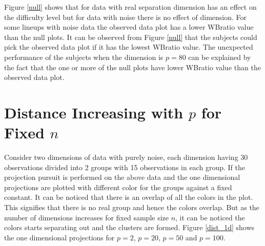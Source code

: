 \documentclass[12]{article}
\begin{document}
Figure \ref{null} shows that for data with real separation dimension has an effect on the difficulty level but for data with noise there is no effect of dimension. For some lineups with noise data the observed data plot has a lower WBratio value than the null plots. It can be observed from Figure \ref{null} that the subjects could pick the observed data plot if it has the lowest WBratio value. The unexpected performance of the subjects when the dimension  is $p = 80$ can be explained by the fact that the one or more of the null plots have lower WBratio value than the observed data plot.


\section{Distance Increasing with $p$ for Fixed $n$} \label{sec:distance}

Consider two dimensions of data with purely noise, each dimension having 30 observations divided into 2 groups with 15 observations in each group. If the projection pursuit is performed on the above data and the one dimensional projections are plotted with different color for the groups against a fixed constant. It can be noticed that there is an overlap of all the colors in the plot. This signifies that there is no real group and hence the colors overlap. But as the number of dimensions increases for fixed sample size $n$, it can be noticed the colors starts separating out and the clusters are formed. Figure \ref{dist_1d} shows the one dimensional projections for $p=2$, $p=20$, $p=50$ and $p=100$. \\
\end{document}
